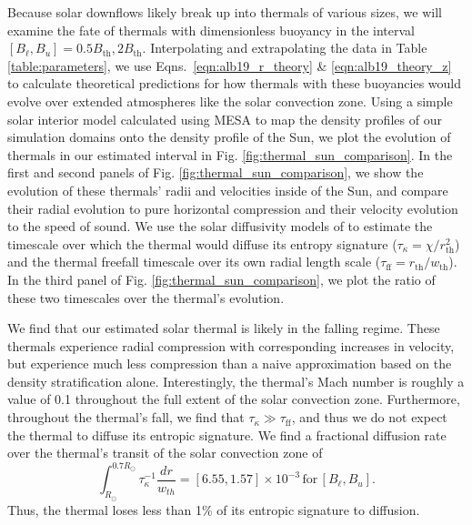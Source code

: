 Because solar downflows likely break up into thermals of various sizes, we will examine the fate of thermals with dimensionless buoyancy in the interval $[B_\ell, B_u] = 0.5B_\text{th}, 2B_\text{th}$.
Interpolating and extrapolating the data in Table \ref{table:parameters}, we use Eqns.~\ref{eqn:alb19_r_theory} \& \ref{eqn:alb19_theory_z} to calculate theoretical predictions for how thermals with these buoyancies would evolve over extended atmospheres like the solar convection zone.
Using a simple solar interior model calculated using MESA \cite{paxton&all2011} to map the density profiles of our simulation domains onto the density profile of the Sun, we plot the evolution of thermals in our estimated interval in Fig. \ref{fig:thermal_sun_comparison}.
In the first and second panels of Fig. \ref{fig:thermal_sun_comparison}, we show the evolution of these thermals' radii and velocities inside of the Sun, and compare their radial evolution to pure horizontal compression and their velocity evolution to the speed of sound.
We use the solar diffusivity models of \cite{brown2011} to estimate the timescale over which the thermal would diffuse its entropy signature ($\tau_\kappa = \chi/r_{\text{th}}^2$) and the thermal freefall timescale over its own radial length scale ($\tau_{\text{ff}} = r_{\text{th}}/w_{\text{th}}$).
In the third panel of Fig. \ref{fig:thermal_sun_comparison}, we plot the ratio of these two timescales over the thermal's evolution.

We find that our estimated solar thermal is likely in the falling regime.
These thermals experience radial compression with corresponding increases in velocity, but experience much less compression than a naive approximation based on the density stratification alone.
Interestingly, the thermal's Mach number is roughly a value of 0.1 throughout the full extent of the solar convection zone.
Furthermore, throughout the thermal's fall, we find that $\tau_\kappa \gg \tau_{\text{ff}}$, and thus we do not expect the thermal to diffuse its entropic signature.
We find a fractional diffusion rate over the thermal's transit of the solar convection zone of 
$$
\int_{R_\odot}^{0.7 R_\odot} \tau_\kappa^{-1} \frac{dr}{w_{th}} = [6.55, 1.57]\times 10^{-3}\,\text{for}\,[B_\ell, B_u].
$$
Thus, the thermal loses less than 1\% of its entropic signature to diffusion.

